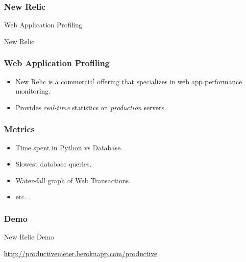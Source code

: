 \documentclass[c,english]{beamer}
\begin{document}
\begin{frame}[fragile]
\frametitle{New Relic}


\begin{block}{ \centering \LARGE Web Application Profiling }

\centering \Large New Relic

\end{block}
\end{frame}

\begin{frame}[fragile]
\frametitle{Web Application Profiling}

\begin{itemize}

\item New Relic is a commercial offering that specializes in web app performance monitoring.

\item Provides \emph{real-time} statistics on \emph{production} servers.
\end{itemize}
\end{frame}

\begin{frame}[fragile]
\frametitle{Metrics}

\begin{itemize}

\item Time spent in Python vs Database.

\item Slowest database queries.

\item Water-fall graph of Web Transactions.

\item etc...
\end{itemize}
\end{frame}

\begin{frame}[fragile]
\frametitle{Demo}


\begin{block}{ \centering \LARGE New Relic Demo }

\centering \Large \url{http://productivemeter.herokuapp.com/productive}

\end{block}

\noindent{}
\end{frame}
\end{document}
